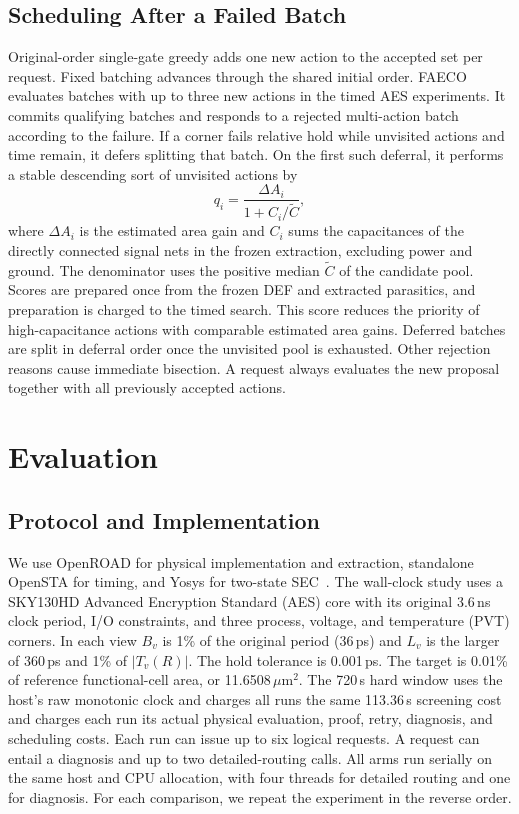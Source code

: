 \documentclass[journal]{IEEEtran}
\newcommand{\um}{\ensuremath{\mu\mathrm{m}^{2}}}
\begin{document}
\subsection{Scheduling After a Failed Batch}
\label{sec:schedule}

Original-order single-gate greedy adds one new action to the accepted set per request. Fixed batching advances through the shared initial order. FAECO evaluates batches with up to three new actions in the timed AES experiments. It commits qualifying batches and responds to a rejected multi-action batch according to the failure. If a corner fails relative hold while unvisited actions and time remain, it defers splitting that batch. On the first such deferral, it performs a stable descending sort of unvisited actions by
\begin{equation}
q_i=\frac{\Delta A_i}{1+C_i/\widetilde{C}},
\label{eq:score}
\end{equation}
where \(\Delta A_i\) is the estimated area gain and \(C_i\) sums the capacitances of the directly connected signal nets in the frozen extraction, excluding power and ground. The denominator uses the positive median \(\widetilde C\) of the candidate pool. Scores are prepared once from the frozen DEF and extracted parasitics, and preparation is charged to the timed search. This score reduces the priority of high-capacitance actions with comparable estimated area gains. Deferred batches are split in deferral order once the unvisited pool is exhausted. Other rejection reasons cause immediate bisection. A request always evaluates the new proposal together with all previously accepted actions.


\section{Evaluation}

\subsection{Protocol and Implementation}

We use OpenROAD for physical implementation and extraction, standalone OpenSTA for timing, and Yosys for two-state SEC~\cite{openroad,sta,yosys}. The wall-clock study uses a SKY130HD Advanced Encryption Standard (AES) core with its original 3.6\,ns clock period, I/O constraints, and three process, voltage, and temperature (PVT) corners. In each view \(B_v\) is 1\% of the original period (36\,ps) and \(L_v\) is the larger of 360\,ps and 1\% of \(\lvert T_v(R)\rvert\). The hold tolerance is 0.001\,ps. The target is 0.01\% of reference functional-cell area, or 11.6508\,\um. The 720\,s hard window uses the host's raw monotonic clock and charges all runs the same 113.36\,s screening cost and charges each run its actual physical evaluation, proof, retry, diagnosis, and scheduling costs. Each run can issue up to six logical requests. A request can entail a diagnosis and up to two detailed-routing calls. All arms run serially on the same host and CPU allocation, with four threads for detailed routing and one for diagnosis. For each comparison, we repeat the experiment in the reverse order.
\end{document}
